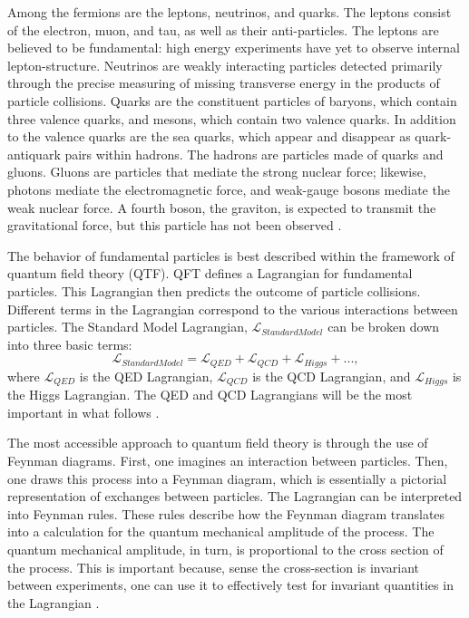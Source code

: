 Among the fermions are the leptons, neutrinos, and quarks. The leptons consist of the electron, muon, and tau, as well as their anti-particles. The leptons are believed to be fundamental: high energy experiments have yet to observe internal lepton-structure. Neutrinos are weakly interacting particles detected primarily through the precise measuring of missing transverse energy in the products of particle collisions. Quarks are the constituent particles of baryons, which contain three valence quarks, and mesons, which contain two valence quarks. In addition to the valence quarks are the sea quarks, which appear and disappear as quark-antiquark pairs within hadrons. The hadrons are particles made of quarks and gluons. Gluons are particles that mediate the strong nuclear force; likewise, photons mediate the electromagnetic force, and weak-gauge bosons mediate the weak nuclear force. A fourth boson, the graviton, is expected to transmit the gravitational force, but this particle has not been observed \cite{Halzen:1984mc}. 

The behavior of fundamental particles is best described within the framework of quantum field theory (QTF). QFT defines a Lagrangian for fundamental particles. This Lagrangian then predicts the outcome of particle collisions. Different terms in the Lagrangian correspond to the various interactions between particles. The Standard Model Lagrangian, $\mathcal{L}_{Standard Model}$ can be broken down into three basic terms:	
\begin{equation}
\mathcal{L}_{Standard Model} = \mathcal{L}_{QED} + \mathcal{L}_{QCD} + \mathcal{L}_{Higgs} + ... ,  
\end{equation} 
where $\mathcal{L}_{QED}$ is the QED Lagrangian, $\mathcal{L}_{QCD}$ is the QCD Lagrangian, and $\mathcal{L}_{Higgs}$ is the Higgs Lagrangian. The QED and QCD Lagrangians will be the most important in what follows \cite{Halzen:1984mc}. 

The most accessible approach to quantum field theory is through the use of Feynman diagrams. First, one imagines an interaction between particles. Then, one draws this process into a Feynman diagram, which is essentially a pictorial representation of exchanges between particles. The Lagrangian can be interpreted into Feynman rules. These rules describe how the Feynman diagram translates into a calculation for the quantum mechanical amplitude of the process. The quantum mechanical amplitude, in turn, is proportional to the cross section of the process. This is important because, sense the cross-section is invariant between experiments, one can use it to effectively test for invariant quantities in the Lagrangian \cite{Peskin:1995ev}.

